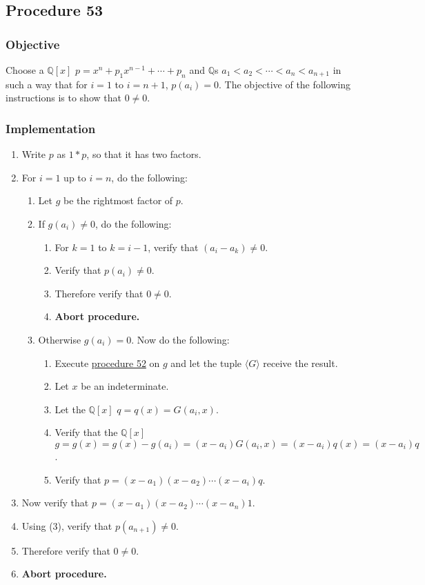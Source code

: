 \documentclass[twocolumn]{article}
\begin{document}
		\subsection{Procedure 53}\label{sec:procedure 53}
			\subsubsection{Objective}
				Choose a $\mathbb{Q}[x]$ $p=x^n+p_1x^{n-1}+\cdots+p_n$ and $\mathbb{Q}$s $a_1<a_2<\cdots<a_n<a_{n+1}$ in such a way that for $i=1$ to $i=n+1$, $p(a_i)=0$. The objective of the following instructions is to show that $0\ne 0$.
			\subsubsection{Implementation}
				\begin{enumerate}
					\item Write $p$ as $1*p$, so that it has two factors.
					\item For $i=1$ up to $i=n$, do the following:
					\begin{enumerate}
						\item Let $g$ be the rightmost factor of $p$.
						\item If $g(a_i)\ne 0$, do the following:
						\begin{enumerate}
							\item For $k=1$ to $k=i-1$, verify that $(a_i-a_k)\ne 0$.
							\item Verify that $p(a_i)\ne 0$.
							\item Therefore verify that $0\ne 0$.
							\item \textbf{Abort procedure.}
						\end{enumerate}
						\item Otherwise $g(a_i)=0$. Now do the following:
						\begin{enumerate}
							\item Execute \hyperref[sec:procedure 52]{procedure 52} on $g$ and let the tuple $\langle G\rangle$ receive the result.
							\item Let $x$ be an indeterminate.
							\item Let the $\mathbb{Q}[x]$ $q=q(x)=G(a_i,x)$.
							\item Verify that the $\mathbb{Q}[x]$ $g=g(x)=g(x)-g(a_i)=(x-a_i)G(a_i,x)=(x-a_i)q(x)=(x-a_i)q$.
							\item Verify that $p=(x-a_1)(x-a_2)\cdots(x-a_i)q$.
						\end{enumerate}
					\end{enumerate}
					\item Now verify that $p=(x-a_1)(x-a_2)\cdots(x-a_n)1$.
					\item Using (3), verify that $p(a_{n+1})\ne 0$.
					\item Therefore verify that $0\ne 0$.
					\item \textbf{Abort procedure.}
				\end{enumerate}
\end{document}
